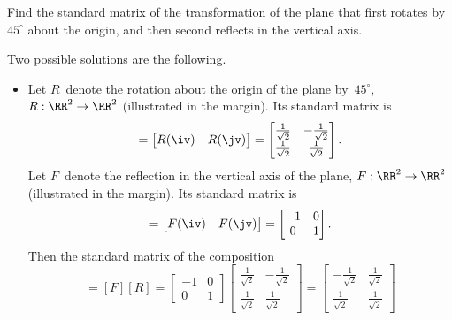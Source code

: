 \begin{example} \label{eg:}
Find the standard matrix of the transformation of the plane that first rotates by~\(45^\circ\) about the origin, and then second reflects in the vertical axis.
\begin{solution} 
Two possible solutions are the following.
\begin{itemize}
\item Let \(R\)~denote the rotation about the origin of the plane by~\(45^\circ\), \(R:\RR^2\to\RR^2\) (illustrated in the margin).
%
Its standard matrix is
\newcommand{\rt}{\frac1{\sqrt2}}
\begin{equation*}
[R]=\begin{bmatrix} R(\iv)&R(\jv) \end{bmatrix}
=\begin{bmatrix} \rt&-\rt\\\rt&\rt \end{bmatrix}.
\end{equation*}
Let \(F\)~denote the reflection in the vertical axis of the plane, \(F:\RR^2\to\RR^2\) (illustrated in the margin). 
%
Its standard matrix is
\begin{equation*}
[F]=\begin{bmatrix} F(\iv)&F(\jv) \end{bmatrix}
=\begin{bmatrix} -1&0\\0&1 \end{bmatrix}.
\end{equation*}
Then the standard matrix of the composition 
\begin{equation*}
[F\circ R]=[F][R]
=\begin{bmatrix} -1&0\\0&1 \end{bmatrix}
\begin{bmatrix} \rt&-\rt\\\rt&\rt \end{bmatrix}
=\begin{bmatrix} -\rt&\rt\\\rt&\rt \end{bmatrix}
\end{equation*}


\end{itemize}
\end{solution}
\end{example}
